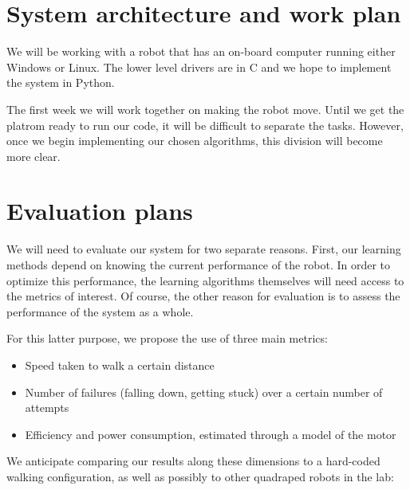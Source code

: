 \section{System architecture and work plan}

We will be working with a robot that has an on-board computer running
either Windows or Linux. The lower level drivers are in C and we hope
to implement the system in Python.

The first week we will work together on making the robot move. Until we get the platrom ready to run our code, it will be difficult to separate the tasks. However, once we begin implementing our chosen algorithms, this division will become more clear.



% 
% 
% 


\section{Evaluation plans}
\label{sec:evaluation}

We will need to evaluate our system for two separate reasons.  First,
our learning methods depend on knowing the current performance of the
robot.  In order to optimize this performance, the learning algorithms
themselves will need access to the metrics of interest.  Of course,
the other reason for evaluation is to assess the performance of the
system as a whole.

For this latter purpose, we propose the use of three main metrics:

\begin{itemize}
\item Speed taken to walk a certain distance
\item Number of failures (falling down, getting stuck) over a certain number of attempts
\item Efficiency and power consumption, estimated through a model of the motor
\end{itemize}

\noindent We anticipate comparing our results along these dimensions
to a hard-coded walking configuration, as well as possibly to other
quadraped robots in the lab:




